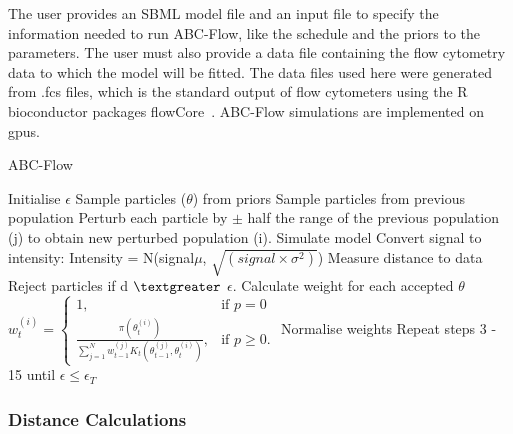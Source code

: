 The user provides an SBML model file and an input file to specify the information needed to run ABC-Flow, like the \epsilon schedule and the priors to the parameters. The user must also provide a data file containing the flow cytometry data to which the model will be fitted. The data files used here were generated from .fcs files, which is the standard output of flow cytometers using the R bioconductor packages flowCore~\autocite{flowCore:man}. ABC-Flow simulations are implemented on \acrshort{gpu}s.



\begin{algorithm}[htbp]

\caption{ABC-Flow}
\label{alg:abc-flow}
 \begin{algorithmic}[1]
 	\Statex
 	
	\State Initialise $\epsilon$ 
		\State Sample particles ($\theta$) from priors
		\Else
			\State Sample particles from previous population
			\State Perturb each particle by $\pm$ half the range of the previous population (j) to obtain new perturbed population (i).
	\EndIf
	\State Simulate model
	\State Convert signal to intensity: 
					\State Intensity = N\bigg(signal\times$\mu$,  $\sqrt{(signal\times\sigma^2)}$\bigg)
	\EndFor				
	\EndFor	
	\EndFor	
	\EndFor	
	\State Measure distance to data
	\State Reject particles if d $\textgreater$ $\epsilon$.
    \State Calculate weight for each accepted $\theta$
	\State $w_{t}^{(i)} = \begin{cases} 1, & \mbox{if } p = 0 \\\frac{\pi(\theta_{t}^{(i)})}{\sum_{j=1}^N w_{t-1}^{(j)} K_{t}(\theta_{t-1}^{(j)}, \theta_{t}^{(i)})}, & \mbox{if } p \geq  0. \end{cases}$
	\State Normalise weights
	\State Repeat steps 3 - 15 until $\epsilon \leq \epsilon_T$	%
  \end{algorithmic}
\end{algorithm}

\clearpage
\subsubsection{Distance Calculations}

